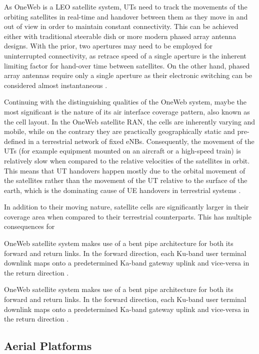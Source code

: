 \documentclass[english, 12pt, a4paper, elec, utf8, a-1b, online]{aaltothesis}
\begin{document}
As OneWeb is a LEO satellite system, UTs need to track the movements of the orbiting satellites in real-time and handover between them as they move in and out of view in order to maintain constant connectivity.
This can be achieved either with traditional steerable dish or more modern phased array antenna designs.
With the prior, two apertures may need to be employed for uninterrupted connectivity, as retrace speed of a single aperture is the inherent limiting factor for hand-over time between satellites.
On the other hand, phased array antennas require only a single aperture as their electronic switching can be considered almost instantaneous \cite{worldvu2016loi}.

Continuing with the distinguishing qualities of the OneWeb system, maybe the most significant is the nature of its air interface coverage pattern, also known as the cell layout.
In the OneWeb satellite RAN, the cells are inherently varying and mobile, while on the contrary they are practically geographically static and pre-defined in a terrestrial network of fixed eNBs.
Consequently, the movement of the UTs (for example equipment mounted on an aircraft or a high-speed train) is relatively slow when compared to the relative velocities of the satellites in orbit.
This means that UT handovers happen mostly due to the orbital movement of the satellites rather than the movement of the UT relative to the surface of the earth, which is the dominating cause of UE handovers in terrestrial systems \cite{corson2019admission}.

In addition to their moving nature, satellite cells are significantly larger in their coverage area when compared to their terrestrial counterparts.
This has multiple consequences for \cite{corson2019admission}

OneWeb satellite system makes use of a bent pipe architecture for both its forward and return links.
In the forward direction, each Ku-band user terminal downlink maps onto a predetermined Ka-band gateway uplink and vice-versa in the return direction \cite{worldvu2016loi, portillo2019technical}.

OneWeb satellite system makes use of a bent pipe architecture for both its forward and return links.
In the forward direction, each Ku-band user terminal downlink maps onto a predetermined Ka-band gateway uplink and vice-versa in the return direction \cite{worldvu2016loi, portillo2019technical}.

\subsection{Aerial Platforms} \label{sect-aerial-platforms}
\end{document}

